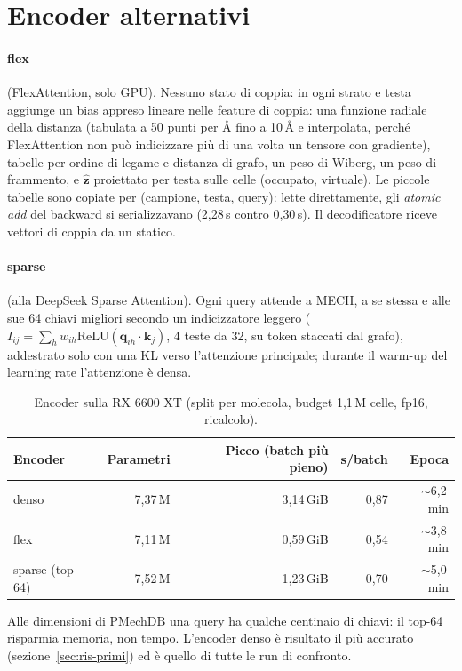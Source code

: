 \documentclass[11pt,a4paper]{report}
\newcommand{\code}[1]{\texttt{\detokenize{#1}}}
\newcommand{\vb}[1]{\bm{#1}}
\begin{document}
\section{Encoder alternativi}
\paragraph{flex} (FlexAttention, solo GPU). Nessuno stato di coppia: in \code{score_mod} ogni strato e
testa aggiunge un bias appreso lineare nelle feature di coppia: una funzione radiale della distanza
(tabulata a 50 punti per Å fino a 10\,Å e interpolata, perché FlexAttention non può indicizzare più di
una volta un tensore con gradiente), tabelle per ordine di legame e distanza di grafo, un peso di
Wiberg, un peso di frammento, e $\hat{\vb z}$ proiettato per testa sulle celle (occupato, virtuale). Le
piccole tabelle sono copiate per (campione, testa, query): lette direttamente, gli \emph{atomic add}
del backward si serializzavano (2{,}28\,s contro 0{,}30\,s). Il decodificatore riceve vettori di coppia
da un \code{AtomPairHead} statico.
\paragraph{sparse} (alla DeepSeek Sparse Attention). Ogni query attende a MECH, a se stessa e alle sue
64 chiavi migliori secondo un indicizzatore leggero ($I_{ij}=\sum_hw_{ih}\mathrm{ReLU}(\vb q_{ih}\cdot
\vb k_j)$, 4 teste da 32, su token staccati dal grafo), addestrato solo con una KL verso l'attenzione
principale; durante il warm-up del learning rate l'attenzione è densa.

\begin{table}[H]
\centering
\caption{Encoder sulla RX 6600 XT (split per molecola, budget 1{,}1\,M celle, fp16, ricalcolo).}
\label{tab:encoder}
\begin{tabular}{@{}lrrrr@{}}
\toprule
Encoder & Parametri & Picco (batch più pieno) & s/batch & Epoca\\
\midrule
denso & 7{,}37\,M & 3{,}14\,GiB & 0{,}87 & $\sim$6{,}2\,min\\
flex & 7{,}11\,M & 0{,}59\,GiB & 0{,}54 & $\sim$3{,}8\,min\\
sparse (top-64) & 7{,}52\,M & 1{,}23\,GiB & 0{,}70 & $\sim$5{,}0\,min\\
\bottomrule
\end{tabular}
\end{table}
Alle dimensioni di PMechDB una query ha qualche centinaio di chiavi: il top-64 risparmia memoria, non
tempo. L'encoder denso è risultato il più accurato (sezione~\ref{sec:ris-primi}) ed è quello di tutte
le run di confronto.
\end{document}
